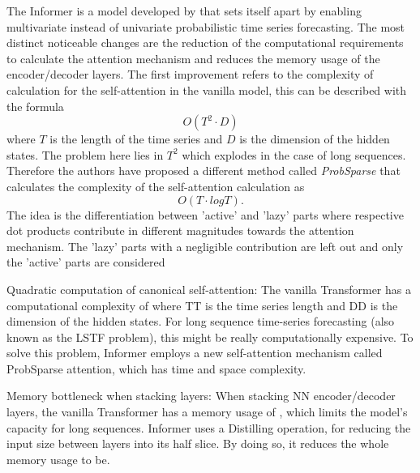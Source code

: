 \documentclass{article}
\begin{document}
The Informer is a model developed by \cite{Informer} that sets itself apart by enabling multivariate instead of univariate probabilistic time series forecasting. The most distinct noticeable changes are the reduction of the computational requirements to calculate the attention mechanism and reduces the memory usage of the encoder/decoder layers. The first improvement refers to the complexity of calculation for the self-attention in the vanilla model, this can be described with the formula
\begin{equation*}
    O(T^2 \cdot D)
\end{equation*}
where $T$ is the length of the time series and $D$ is the dimension of the hidden states. The problem here lies in $T^2$ which explodes in the case of long sequences. Therefore the authors have proposed a different method called \textit{ProbSparse} that calculates the complexity of the self-attention calculation as
\begin{equation*}
    O(T \cdot log{T}) .
\end{equation*}
The idea is the differentiation between 'active' and 'lazy' parts where respective dot products contribute in different magnitudes towards the attention mechanism. The 'lazy' parts with a negligible contribution are left out and only the 'active' parts are considered

    Quadratic computation of canonical self-attention:
    The vanilla Transformer has a computational complexity of  where TT is the time series length and DD is the dimension of the hidden states. For long sequence time-series forecasting (also known as the LSTF problem), this might be really computationally expensive. To solve this problem, Informer employs a new self-attention mechanism called ProbSparse attention, which has time and space complexity.
    
    Memory bottleneck when stacking layers:
    When stacking NN encoder/decoder layers, the vanilla Transformer has a memory usage of , which limits the model's capacity for long sequences. Informer uses a Distilling operation, for reducing the input size between layers into its half slice. By doing so, it reduces the whole memory usage to be.
\end{document}
